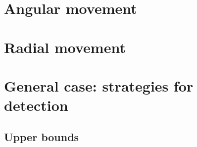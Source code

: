 \documentclass[12pt]{article}
\begin{document}
\section{Angular movement}\label{sec:angular}
%


\section{Radial movement}\label{sec:radial}
%



\section{General case: strategies for detection}\label{sec:mix}
%



\subsection{Upper bounds}\label{sec:Upper}



%




\end{document}
